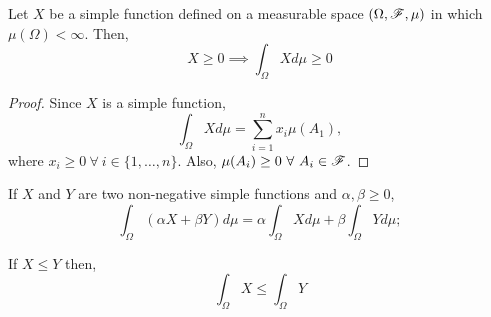 \documentclass[../TGMAFFIRO.tex]{subfiles}
\begin{document}
\begin{proposition} \label{prop:nnlmsf}
	Let $X$ be a simple function defined on a measurable space $(\Omega, \mathscr{F}, \mu)$ in which $\mu(\Omega) < \infty$. Then,
	\begin{equation}
		X \geq 0 \implies \int_\Omega X d\mu \geq 0
	\end{equation}
\end{proposition}

\begin{proof}
	Since $X$ is a simple function,
	\[
	\int_\Omega X d\mu = \sum_{i=1}^n x_i \mu(A_1),
	\]
	where $x_i \geq 0 \ \forall \ i \in \{1, \ldots, n\}$. Also, $\mu(A_i) \geq 0 \ \forall \ A_i \in \mathscr{F}$.
\end{proof}

\begin{theorem}
	If $X$ and $Y$ are two non-negative simple functions and $\alpha, \beta \geq 0$,
	\begin{equation}
		\int_\Omega (\alpha X + \beta Y) d\mu = \alpha\int_\Omega X d\mu + \beta\int_\Omega Y d\mu;
	\end{equation}
	
	If $X \leq Y$ then,
	\begin{equation}
		\int_\Omega X \leq \int_\Omega Y
	\end{equation} 
\end{theorem}
\end{document}
